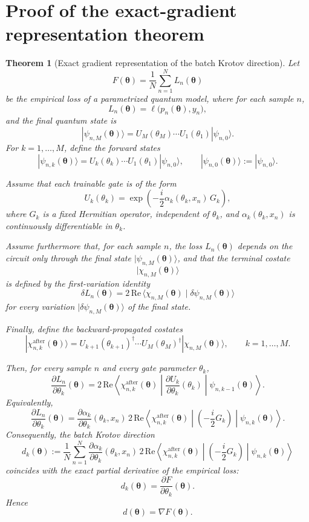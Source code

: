 \documentclass[aps,prb,10pt,twocolumn,superscriptaddress]{revtex4-2}
\newtheorem{theorem}{Theorem}
\begin{document}
\section{Proof of the exact-gradient representation theorem}

\begin{theorem}[Exact gradient representation of the batch Krotov direction]
\label{thm:exact_gradient_krotov_appendix}
Let
\[
F(\bm{\theta})=\frac{1}{N}\sum_{n=1}^N L_n(\bm{\theta})
\]
be the empirical loss of a parametrized quantum model, where for each sample \(n\),
\[
L_n(\bm{\theta})=\ell\bigl(p_n(\bm{\theta}),y_n\bigr),
\]
and the final quantum state is
\[
|\psi_{n,M}(\bm{\theta})\rangle
=
U_M(\theta_M)\cdots U_1(\theta_1)|\psi_{n,0}\rangle.
\]
For \(k=1,\dots,M\), define the forward states
\[
|\psi_{n,k}(\bm{\theta})\rangle
=
U_k(\theta_k)\cdots U_1(\theta_1)|\psi_{n,0}\rangle,
\qquad
|\psi_{n,0}(\bm{\theta})\rangle:=|\psi_{n,0}\rangle.
\]

Assume that each trainable gate is of the form
\[
U_k(\theta_k)=\exp\!\left(-\frac{i}{2}\alpha_k(\theta_k,x_n)\,G_k\right),
\]
where \(G_k\) is a fixed Hermitian operator, independent of \(\theta_k\), and
\(\alpha_k(\theta_k,x_n)\) is continuously differentiable in \(\theta_k\).

Assume furthermore that, for each sample \(n\), the loss \(L_n(\bm{\theta})\) depends on the
circuit only through the final state \( |\psi_{n,M}(\bm{\theta})\rangle \), and that the terminal costate
\[
|\chi_{n,M}(\bm{\theta})\rangle
\]
is defined by the first-variation identity
\[
\delta L_n(\bm{\theta})
=
2\,\mathrm{Re}\,\langle \chi_{n,M}(\bm{\theta})\mid \delta\psi_{n,M}(\bm{\theta})\rangle
\]
for every variation \(|\delta\psi_{n,M}(\bm{\theta})\rangle\) of the final state.

Finally, define the backward-propagated costates
\[
|\chi_{n,k}^{\mathrm{after}}(\bm{\theta})\rangle
=
U_{k+1}(\theta_{k+1})^\dagger\cdots U_M(\theta_M)^\dagger
|\chi_{n,M}(\bm{\theta})\rangle,
\qquad k=1,\dots,M.
\]

Then, for every sample \(n\) and every gate parameter \(\theta_k\),
\[
\frac{\partial L_n}{\partial \theta_k}(\bm{\theta})
=
2\,\mathrm{Re}\!\left\langle
\chi_{n,k}^{\mathrm{after}}(\bm{\theta})
\middle|
\frac{\partial U_k}{\partial \theta_k}(\theta_k)
\middle|
\psi_{n,k-1}(\bm{\theta})
\right\rangle.
\]
Equivalently,
\[
\frac{\partial L_n}{\partial \theta_k}(\bm{\theta})
=
\frac{\partial \alpha_k}{\partial \theta_k}(\theta_k,x_n)\,
2\,\mathrm{Re}\!\left\langle
\chi_{n,k}^{\mathrm{after}}(\bm{\theta})
\middle|
\left(-\frac{i}{2}G_k\right)
\middle|
\psi_{n,k}(\bm{\theta})
\right\rangle.
\]
Consequently, the batch Krotov direction
\[
d_k(\bm{\theta})
:=
\frac{1}{N}\sum_{n=1}^N
\frac{\partial \alpha_k}{\partial \theta_k}(\theta_k,x_n)\,
2\,\mathrm{Re}\!\left\langle
\chi_{n,k}^{\mathrm{after}}(\bm{\theta})
\middle|
\left(-\frac{i}{2}G_k\right)
\middle|
\psi_{n,k}(\bm{\theta})
\right\rangle
\]
coincides with the exact partial derivative of the empirical loss:
\[
d_k(\bm{\theta})=\frac{\partial F}{\partial \theta_k}(\bm{\theta}).
\]
Hence
\[
d(\bm{\theta})=\nabla F(\bm{\theta}).
\]
\end{theorem}
\end{document}
